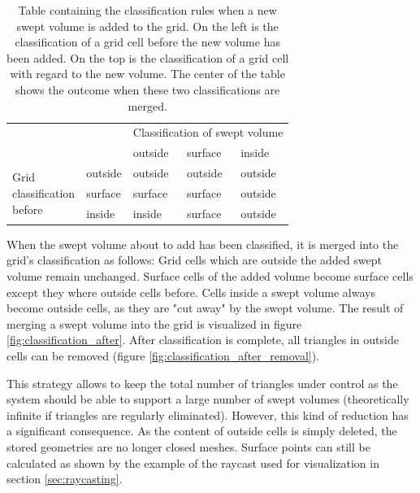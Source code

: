 \begin{table}[h]
	\centering
	\begin{tabular}{p{2cm}p{2cm}|p{2cm}p{2cm}p{2cm}}
		&         & \multicolumn{3}{l}{Classification of swept volume} \\
		&         & outside           & surface           & inside            \\ \hline
		\multirow{3}{*}{\parbox{2cm}{Grid \\ classification \\ before}} & outside & outside           & outside           & outside           \\
		& surface & surface           & surface           & outside           \\
		& inside  & inside            & surface           & outside          
	\end{tabular}
	\caption{
		Table containing the classification rules when a new swept volume is added to the grid.
		On the left is the classification of a grid cell before the new volume has been added.
		On the top is the classification of a grid cell with regard to the new volume.
		The center of the table shows the outcome when these two classifications are merged.
	}
	\label{tbl:classification_rules}
\end{table}

When the swept volume about to add has been classified, it is merged into the grid's classification as follows:
Grid cells which are outside the added swept volume remain unchanged.
Surface cells of the added volume become surface cells except they where outside cells before.
Cells inside a swept volume always become outside cells, as they are "cut away" by the swept volume.
The result of merging a swept volume into the grid is visualized in figure \ref{fig:classification_after}.
After classification is complete, all triangles in outside cells can be removed (\cf figure \ref{fig:classification_after_removal}).

This strategy allows to keep the total number of triangles under control as the system should be able to support a large number of swept volumes (theoretically infinite if triangles are regularly eliminated).
%
However, this kind of reduction has a significant consequence.
As the content of outside cells is simply deleted, the stored geometries are no longer closed meshes.
Surface points can still be calculated as shown by the example of the raycast used for visualization in section \ref{sec:raycasting}.

